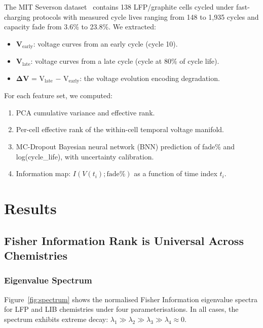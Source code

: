 \documentclass[preprint,12pt]{elsarticle}
\begin{document}
The MIT Severson dataset~\cite{Severson2019} contains 138 LFP/graphite cells cycled under fast-charging protocols with measured cycle lives ranging from 148 to 1{,}935 cycles and capacity fade from 3.6\% to 23.8\%.
We extracted:

\begin{itemize}
\item \textbf{V$_{\mathrm{early}}$}: voltage curves from an early cycle (cycle 10).
\item \textbf{V$_{\mathrm{late}}$}: voltage curves from a late cycle (cycle at 80\% of cycle life).
\item $\bm{\Delta V}$ = V$_{\mathrm{late}}$ $-$ V$_{\mathrm{early}}$: the voltage evolution encoding degradation.
\end{itemize}

For each feature set, we computed:
\begin{enumerate}
\item PCA cumulative variance and effective rank.
\item Per-cell effective rank of the within-cell temporal voltage manifold.
\item MC-Dropout Bayesian neural network (BNN) prediction of fade\% and log(cycle\_life), with uncertainty calibration.
\item Information map: $I(V(t_i); \mathrm{fade}\%)$ as a function of time index $t_i$.
\end{enumerate}

\section{Results}
\label{sec:results}

\subsection{Fisher Information Rank is Universal Across Chemistries}
\label{sec:rank}

\subsubsection{Eigenvalue Spectrum}

Figure~\ref{fig:spectrum} shows the normalised Fisher Information eigenvalue spectra for LFP and LIB chemistries under four parameterisations.
In all cases, the spectrum exhibits extreme decay: $\lambda_1 \gg \lambda_2 \gg \lambda_3 \gg \lambda_4 \approx 0$.
\end{document}
